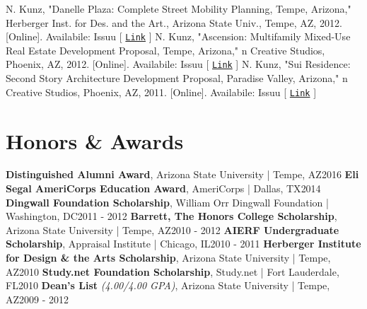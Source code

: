 \documentclass{article}
\begin{document}
        N. Kunz, "Danelle Plaza: Complete Street Mobility Planning, Tempe, Arizona," Herberger Inst. for Des. and the Art., Arizona State Univ., Tempe, AZ, 2012. [Online]. Availabile:\newline\newline
        \faBook\space Issuu [ \href{https://issuu.com/nickkunz/docs/danelle_plaza}{\texttt{Link}} ]\newline\newline
        N. Kunz, "Ascension: Multifamily Mixed-Use Real Estate Development Proposal, Tempe, Arizona," n Creative Studios, Phoenix, AZ, 2012. [Online]. Availabile:\newline\newline
        \faBook\space Issuu [ \href{https://issuu.com/nickkunz/docs/ascension}{\texttt{Link}} ]\newline\newline
        N. Kunz, "Sui Residence: Second Story Architecture Development Proposal, Paradise Valley, Arizona," n Creative Studios, Phoenix, AZ, 2011. [Online]. Availabile:\newline\newline
        \faBook\space Issuu [ \href{https://issuu.com/nickkunz/docs/sui}{\texttt{Link}} ]
\newpage
    \section*{Honors \& Awards}
        \textbf{Distinguished Alumni Award}, Arizona State University | Tempe, AZ\hfill{2016}\newline
        \textbf{Eli Segal AmeriCorps Education Award}, AmeriCorps | Dallas, TX\hfill{2014}\newline
        \textbf{Dingwall Foundation Scholarship}, William Orr Dingwall Foundation | Washington, DC\hfill{2011 - 2012}\newline
        \textbf{Barrett, The Honors College Scholarship}, Arizona State University | Tempe, AZ\hfill{2010 - 2012}\newline
        \textbf{AIERF Undergraduate Scholarship}, Appraisal Institute | Chicago, IL\hfill{2010 - 2011}\newline
        \textbf{Herberger Institute for Design \& the Arts Scholarship}, Arizona State University | Tempe, AZ\hfill{2010}\newline
        \textbf{Study.net Foundation Scholarship}, Study.net | Fort Lauderdale, FL\hfill{2010}\newline
        \textbf{Dean's List} \textit{(4.00/4.00 GPA)}, Arizona State University | Tempe, AZ\hfill{2009 - 2012}
\end{document}
